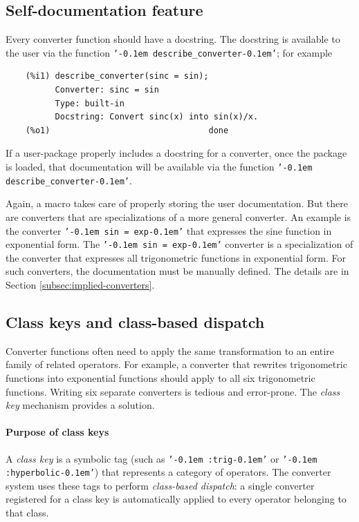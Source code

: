 \documentclass[12pt,fleqn]{extarticle}
\newcommand{\ttq}[1]{\texttt{'\kern-0.1em #1\kern-0.1em'}}
\newenvironment{maximabox}
  {\begin{tcolorbox}[
      breakable,
      enhanced,
      colback=white,
      colframe=black!8,
      boxrule=0pt,
      borderline west={2.2pt}{0pt}{black!25},
      arc=1pt,
      left=11pt,
      right=7pt,
      top=9pt,
      bottom=9pt,
      before skip=14pt,
      after skip=14pt
    ]}
  {\end{tcolorbox}}
\begin{document}
 
 \subsection{Self-documentation feature}
 
 Every converter function should have a docstring.  The docstring is available to the user
 via the function \ttq{describe\_converter}; for example
\begin{maximabox}
  \begin{verbatim}
    (%i1) describe_converter(sinc = sin);
          Converter: sinc = sin
          Type: built-in
          Docstring: Convert sinc(x) into sin(x)/x.
    (%o1)                                done
  \end{verbatim}
\end{maximabox}
If a user-package properly includes a docstring for a converter, once the package is loaded, that documentation will be available via the function \ttq{describe\_converter}.  

Again, a macro takes care of properly storing the user documentation. But there are converters that
are specializations of a more general converter.  An example is the converter \ttq{sin = exp} that expresses the sine function in exponential form. The  \ttq{sin = exp} converter is a specialization of the converter that expresses all trigonometric functions in exponential form.  For such converters, the documentation must be manually defined. The details are in Section \ref{subsec:implied-converters}.


\subsection{Class keys and class-based dispatch}

Converter functions often need to apply the same transformation to an entire
family of related operators. For example, a converter that rewrites
trigonometric functions into exponential functions should apply to
all six trigonometric functions. Writing six separate converters is tedious and 
error-prone. The \emph{class key} mechanism provides a solution.

\paragraph{Purpose of class keys} A \emph{class key} is a symbolic tag (such as \ttq{:trig} or
\ttq{:hyperbolic}) that represents a category of operators. The converter
system uses these tags to perform \emph{class-based dispatch}: a single
converter registered for a class key is automatically applied to every
operator belonging to that class.
\end{document}
